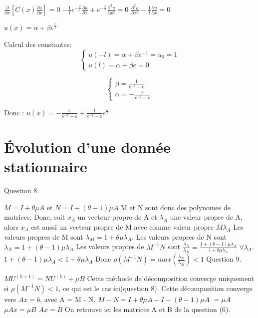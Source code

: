\documentclass[a4paper,11pt]{article}
\theoremstyle{nonumberplain}
\theoremstyle{nonumberplain}
\begin{document}
$  \frac{\partial}{\partial x}[C(x)\frac{\partial u}{\partial x}] = 0 $
$  -\frac{1}{l} e^{-\frac{x}{l}}\frac{\partial u}{\partial x} + e^{-\frac{x}{l}} \frac{\partial^2 u }{\partial x^2} = 0 $
$ \frac{\partial^2 u}{\partial x^2} - \frac{1}{l} \frac{\partial u}{\partial x} = 0$

$u(x) = \alpha + \beta e^{\frac{x}{l}} $

Calcul des constantes:
$$\left\{
  \begin{array}{ll}
    u(-l) = \alpha + \beta e^{-1} = u_0 = 1 \\
    u(l) = \alpha + \beta e = 0
  \end{array}
\right.
$$

$$\left\{
  \begin{array}{ll}
    \beta = \frac{1}{e^{-1} - e} \\
    \alpha = -\frac{e}{e^{-1} - e}
  \end{array}
\right.
$$

Donc :
$u(x) = -\frac{e}{e^{-1} - e} + \frac{1}{e^{-1} - e} e^{\frac{x}{l}} $

\section{\'{E}volution d'une donnée stationnaire}

Question 8.
\newline

$M = I+ \theta \mu A$ et $N = I+(\theta - 1)\mu A$
\newline
M et N sont donc des polynomes de matrices.
\newline
Donc, soit $x_A$ un vecteur propre de A et $\lambda_A$ une valeur propre de A,
alors $x_A$ est aussi un vecteur propre de M avec comme valeur propre $M\lambda_A$
\newline
Les valeurs propres de M sont $\lambda_M = 1+\theta \mu \lambda_A$.
\newline
Les valeurs propres de N sont $\lambda_N = 1+(\theta - 1)\mu \lambda_A$
\newline
Les valeurs propres de $M^{-1}N$ sont $\frac{\lambda_N}{\lambda_M} = \frac{1+(\theta - 1)\mu \lambda_A}{1+\theta \mu \lambda_A}$ $\forall \lambda_A$.
$ 1+(\theta - 1)\mu \lambda_A < 1+\theta \mu \lambda_A$
\newline
Donc $\rho(M^{-1}N) = max(\frac{\lambda_N}{\lambda_M}) < 1$
\newline
\newline
Question 9.

$M U^{(k+1)} = NU^{(k)} + \mu B$
Cette méthode de décomposition converge uniquement si $\rho(M^{-1}N) < 1$, ce qui est le cas ici(question 8).
\newline
Cette décomposition converge vers $Ax = b$, avec A = M - N.
\newline
$M - N = I + \theta \mu A - I - (\theta - 1) \mu A$
$ = \mu A $
\newline
$\mu A x = \mu B$
$A x = B$
On retrouve ici les matrices A et B de la question (6).
\end{document}
